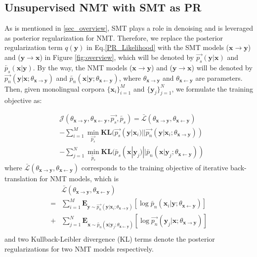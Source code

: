 \documentclass[letterpaper]{article} \usepackage{aaai19}  \usepackage{times}  \usepackage{helvet}  \usepackage{courier}  \usepackage{url}  \usepackage{graphicx}  \usepackage{amsmath}
\newcommand{\newref}[1]{Eq.\eqref{#1}}
\newcommand{\bx}{\mathbf{x}}
\newcommand{\by}{\mathbf{y}}
\newcommand{\righttheta}{\theta_{\bx\rightarrow \by}}
\newcommand{\lefttheta}{\theta_{\bx\leftarrow \by}}
\begin{document}
\subsection{Unsupervised NMT with SMT as PR}
\label{sec_objective}
As is mentioned in \ref{sec_overview}, SMT plays a role in denoising and is leveraged as posterior regularization for NMT. Therefore, we replace the posterior regularization term $q(\by)$ in \newref{PR_Likelihood} with the SMT models ($\bx\rightarrow \by$) and ($\by\rightarrow \bx$) in Figure \ref{fig:overview}, which will be denoted by $\overrightarrow{p_s}(\by|\bx)$ and $\overleftarrow{p_s}(\bx|\by)$. 
By the way, the NMT models ($\bx\rightarrow \by$) and ($\by\rightarrow \bx$) will be denoted by $\overrightarrow{p_n}(\by|\bx;\righttheta)$ and $\overleftarrow{p_n}(\bx|\by;\lefttheta)$, where $\righttheta$ and $\lefttheta$ are parameters. Then,
given monolingual corpora $\{\bx_i\}_{i=1}^M$ and $\{\by_j\}_{j=1}^N$, we formulate the training objective as:

\begin{equation}
\begin{aligned}
& \mathcal{J}(\righttheta,\lefttheta, \overrightarrow{p_s}, \overleftarrow{p_s}) = \bar{\mathcal{L}}(\righttheta,\lefttheta)\\
& -\sum_{i=1}^{M}\min_{\overrightarrow{p_s}}\mathbf{KL}(\overrightarrow{p_s}(\by|\bx_i)||\overrightarrow{p_n}(\by|\bx_i;\righttheta)) \\
& -\sum_{j=1}^{N}\min_{\overleftarrow{p_s}}\mathbf{KL}(\overleftarrow{p_s}(\bx|\by_j)||\overleftarrow{p_n}(\bx|\by_j;\lefttheta)) 
\end{aligned}\label{Training_objective}
\end{equation}
where $\bar{\mathcal{L}}(\righttheta,\lefttheta)$ corresponds to the training objective of iterative back-translation for NMT models, which is
\begin{equation}
\begin{aligned}
& \bar{\mathcal{L}}(\righttheta,\lefttheta)\\
= &\sum_{i=1}^{M}\mathbf{E}_{\by\sim \overrightarrow{p_n}(\by|\bx_i;\righttheta)}[\log \overleftarrow{p_n}(\bx_i|\by;\lefttheta)]\\
+&\sum_{j=1}^{N}\mathbf{E}_{\bx\sim \overleftarrow{p_n}(\bx|\by_j;\lefttheta)}[\log \overrightarrow{p_n}(\by_j|\bx;\righttheta)]\\
\end{aligned}
\label{Unsupervised_NMT_goal}
\end{equation}
and two Kullback-Leibler divergence (KL) terms denote the posterior regularizations for two NMT models respectively. 
\end{document}
